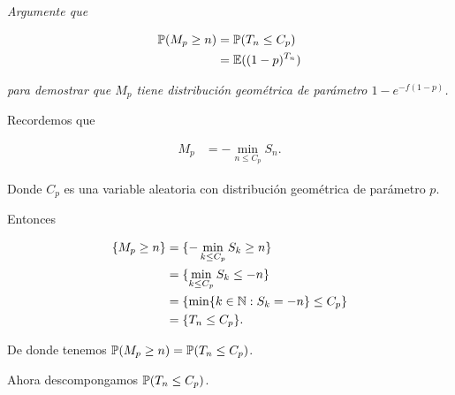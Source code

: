 \emph
{
    Argumente que
}

\begin{align}
    \mathbb{P}(M_p\geq n)  &=  \mathbb{P}(T_n\leq C_p)    \\
                    &=\mathbb{E}((1-p)^{T_n})
\end{align}\par\null

\emph
{
    para demostrar que $M_p$ tiene distribuci\'on geom\'etrica de par\'ametro $1-e^{-f(1-p)}$.
}

\afterstatement\par\null

    Recordemos que
    
    \begin{align}
        M_p     &=  -\min_{n\leq C_p} S_n. 
    \end{align}\par\null
    
    Donde $C_p$ es una variable aleatoria con distribución geométrica de parámetro $p$.\par\null
    
    Entonces 
    
    \begin{align}
        \{ M_p \geq n\}     &=  \{ -\min_{k\leq C_p} S_k \geq n \}          \\
                            &=  \{ \min_{k \leq C_p} S_k \leq -n \}         \\
                            &=  \{ \min\{ k \in \mathbb{N} : S_k = -n \}\leq C_p \}   \\
                            &=  \{ T_n \leq C_p \}.
    \end{align}\par\null
    
    De donde tenemos $\mathbb{P}(M_p\geq n)=\mathbb{P}(T_n\leq C_p)$.\par\null
    
    Ahora descompongamos $\mathbb{P}(T_n \leq C_p)$.
    
